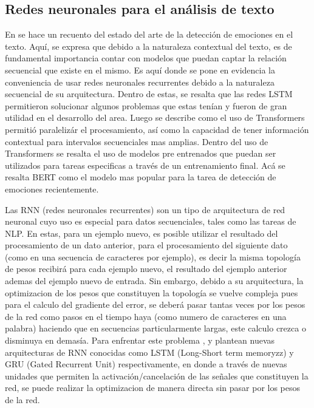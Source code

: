 \subsection{Redes neuronales para el análisis de texto}


En \cite{acheampong2021transformer} se hace un recuento del estado del arte de la detección de emociones en el texto. Aquí, se expresa que debido a la naturaleza contextual del texto, es de fundamental importancia contar con modelos que puedan captar la relación secuencial que existe en el mismo. Es aquí donde se pone en evidencia la conveniencia de usar redes neuronales recurrentes debido a la naturaleza secuencial de su arquitectura. Dentro de estas, se resalta que las redes LSTM permitieron solucionar algunos problemas que estas tenían y fueron de gran utilidad en el desarrollo del area. Luego se describe como el uso de Transformers permitió paralelizár el procesamiento, así como la capacidad de tener información contextual para intervalos secuenciales mas amplias. Dentro del uso de Transformers se resalta el uso de modelos pre entrenados que puedan ser utilizados para tareas especificas a través de un entrenamiento final. Acá se resalta BERT como el modelo mas popular para la tarea de detección de emociones recientemente.



Las RNN (redes neuronales recurrentes) son un tipo de arquitectura de red neuronal cuyo uso es especial para datos secuenciales, tales como las tareas de NLP. En estas, para un ejemplo nuevo, es posible utilizar el resultado del procesamiento de un dato anterior, para el procesamiento del siguiente dato (como en una secuencia de caracteres por ejemplo), es decir la misma topología de pesos recibirá para cada ejemplo nuevo, el resultado del ejemplo anterior ademas del ejemplo nuevo de entrada. Sin embargo, debido a su arquitectura, la optimizacion de los pesos que constituyen la topología se vuelve compleja pues para el calculo del gradiente del error, se deberá pasar tantas veces por los pesos de la red como pasos en el tiempo haya (como numero de caracteres en una palabra) haciendo que en secuencias particularmente largas, este calculo crezca o disminuya en demasía. Para enfrentar este problema , \cite{hochreiter1997long} y \cite{chung2014empirical} plantean nuevas arquitecturas de RNN conocidas como LSTM (Long-Short term memoryzz) y GRU (Gated Recurrent Unit) respectivamente, en donde a través de nuevas unidades que permiten la activación/cancelación de las señales que constituyen la red, se puede realizar la optimizacion de manera directa sin pasar por los pesos de la red.


